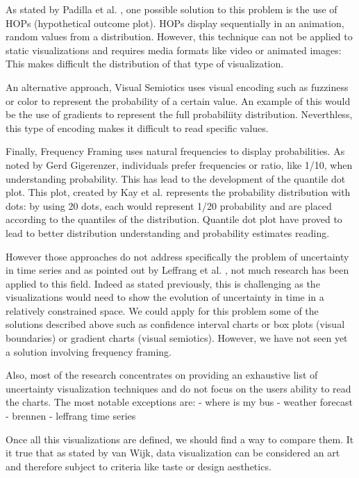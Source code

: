 \documentclass[a4paper,3p,sort&compress]{elsarticle}
\begin{document}
As stated by Padilla et al. \cite{padilla_uncertainty_2021}, one possible solution to this problem is the use of HOPs 
(hypothetical outcome plot). HOPs display 
sequentially in an animation, random values from a distribution. However, this technique can not be 
applied to static visualizations and requires media formats like video or animated images: This makes difficult the distribution 
of that type of visualization.

An alternative approach, Visual Semiotics uses visual encoding such as fuzziness or color to represent 
the probability of a certain value. An example of this would be the use of gradients to represent the 
full probabiliity distribution. Neverthless, this type of encoding makes it difficult to read specific 
values. 

Finally, Frequency Framing uses natural frequencies to display probabilities. As noted by Gerd 
Gigerenzer, individuals prefer frequencies or ratio, like 1/10, when understanding probability. This has 
lead to the development of the quantile dot plot. This plot, created by Kay et al. \cite{2016-when-ish-is-my-bus}
\cite{2016-when-ish-is-my-bus} 
represents 
the probability distribution with dots: by using 20 dots, each would represent 1/20 probability 
and are placed according 
to the quantiles of the distribution. Quantile dot plot have proved to lead to better distribution 
understanding and probability estimates reading. 

However those approaches do not address specifically the problem of uncertainty in time series 
and as pointed out by Leffrang et al. \cite{leffrang_should_2021}, not much research has been applied to this 
field. Indeed as stated previously, this is challenging as the visualizations would need to show the evolution 
of uncertainty in time in a relatively constrained space. We could apply for this problem some of the solutions 
described above such as confidence interval charts or 
box plots (visual boundaries) or gradient charts (visual semiotics). However, we have not seen yet a solution involving 
frequency framing. 

Also, most of the research concentrates on providing an exhaustive list of uncertainty visualization techniques and do not 
focus on the users ability to read the charts. The most notable exceptions are:
- where is my bus
- weather forecast 
- brennen 
- leffrang time series

Once all this visualizations are defined, we should find a way to compare them. It it true that as stated by van Wijk,
data visualization can be considered an art and therefore subject to criteria like taste or design aesthetics.
\end{document}
